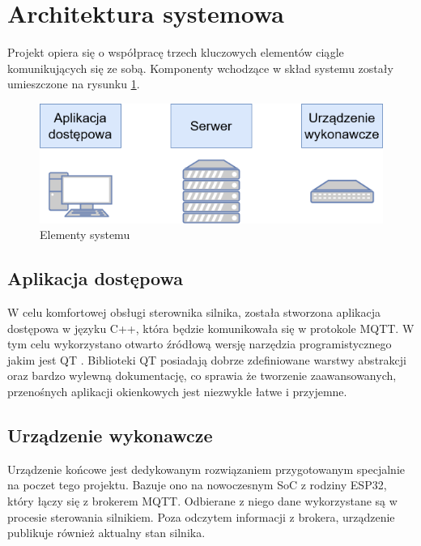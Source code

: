  
    \section{Architektura systemowa}
        Projekt opiera się o współpracę trzech kluczowych elementów ciągle komunikujących się ze sobą. Komponenty wchodzące w skład systemu zostały umieszczone na rysunku \ref{fig:system}.
        
        \begin{figure}[ht]
          \centering
          \includegraphics[width=1\textwidth]{img/system.png}
          \caption{Elementy systemu}
          \label{fig:system}
        \end{figure}


        \subsection{Aplikacja dostępowa}
            W celu komfortowej obsługi sterownika silnika, została stworzona aplikacja dostępowa w języku C++, która będzie komunikowała się w protokole MQTT. W tym celu wykorzystano otwarto źródłową wersję narzędzia programistycznego jakim jest QT \cite{qt}. Biblioteki QT posiadają dobrze zdefiniowane warstwy abstrakcji oraz bardzo wylewną dokumentację, co sprawia że tworzenie zaawansowanych, przenośnych aplikacji okienkowych jest niezwykle łatwe i przyjemne.
        
        \subsection{Urządzenie wykonawcze}
            Urządzenie końcowe jest dedykowanym rozwiązaniem przygotowanym specjalnie na poczet tego projektu. Bazuje ono na nowoczesnym SoC z rodziny ESP32, który łączy się z brokerem MQTT. Odbierane z niego dane wykorzystane są w procesie sterowania silnikiem. Poza odczytem informacji z brokera, urządzenie publikuje również aktualny stan silnika.
        
